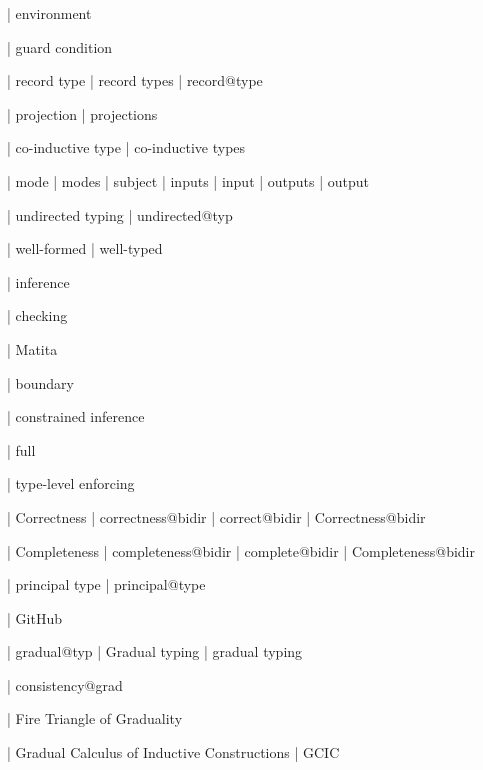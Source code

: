   | environment

  | guard condition

  | record type
  | record types
  | record@type

  | projection
  | projections

  | co-inductive type
  | co-inductive types


  | mode
  | modes
  | subject
  | inputs
  | input
  | outputs
  | output

  | undirected typing
  | undirected@typ


  | well-formed
  | well-typed

  | inference

  | checking

  | Matita

  | boundary

  | constrained inference

  | full

  | type-level enforcing

  | Correctness
  | correctness@bidir
  | correct@bidir
  | Correctness@bidir

  | Completeness
  | completeness@bidir
  | complete@bidir
  | Completeness@bidir


  | principal type
  | principal@type


  | GitHub


  | gradual@typ
  | Gradual typing
  | gradual typing

  | consistency@grad

  | Fire Triangle of Graduality

  | Gradual Calculus of Inductive Constructions
  | GCIC